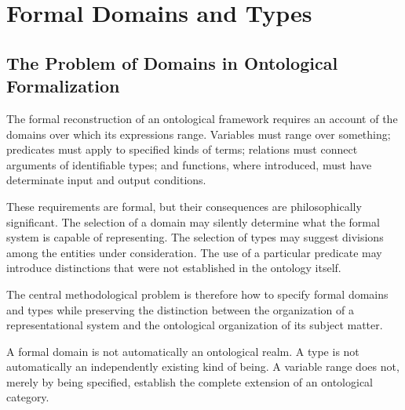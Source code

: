 
\section{Formal Domains and Types}
\label{sec:ch07_s03}

\subsection{The Problem of Domains in Ontological Formalization}

The formal reconstruction of an ontological framework requires
an account of the domains over which its expressions range.
Variables must range over something; predicates must apply
to specified kinds of terms; relations must connect arguments
of identifiable types; and functions, where introduced,
must have determinate input and output conditions.

These requirements are formal, but their consequences are
philosophically significant. The selection of a domain may
silently determine what the formal system is capable of
representing. The selection of types may suggest divisions
among the entities under consideration. The use of a
particular predicate may introduce distinctions that were
not established in the ontology itself.

The central methodological problem is therefore how to
specify formal domains and types while preserving the
distinction between the organization of a representational
system and the ontological organization of its subject matter.

A formal domain is not automatically an ontological realm.
A type is not automatically an independently existing
kind of being. A variable range does not, merely by being
specified, establish the complete extension of an
ontological category.

